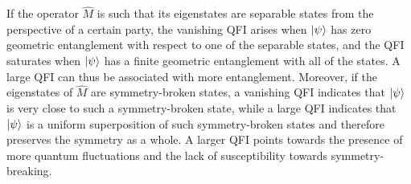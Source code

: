 \documentclass{iopart}
\begin{document}
If the operator \(\hat M\) is such that its eigenstates are separable states from the perspective of a certain party, the vanishing QFI arises when \(\ket{\psi}\) has zero geometric entanglement with respect to one of the separable states, and the QFI saturates when \(\ket{\psi}\) has a finite geometric entanglement with all of the states.
A large QFI can thus be associated with more entanglement. 
Moreover, if the eigenstates of \(\hat M\) are symmetry-broken states, a vanishing QFI indicates that \(\ket{\psi}\) is very close to such a symmetry-broken state, while a large QFI indicates that \(\ket{\psi}\) is a uniform superposition of such symmetry-broken states and therefore preserves the symmetry as a whole. A larger QFI points towards the presence of more quantum fluctuations and the lack of susceptibility towards symmetry-breaking.
\end{document}

